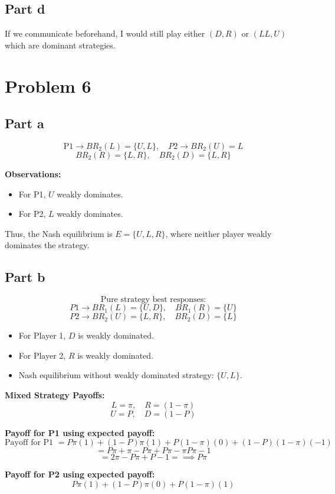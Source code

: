 \documentclass{article}
\begin{document}
\subsection{Part d} 
If we communicate beforehand, I would still play either $(D,R)$ or $(LL, U)$ which are dominant strategies. 

\section{Problem 6}

\subsection{Part a}
\[
\text{P1} \to BR_2(L) = \{U, L\}, \quad P2 \to BR_2(U) = L
\]
\[
BR_2(R) = \{L, R\}, \quad BR_2(D) = \{L, R\}
\]

\textbf{Observations:}
\begin{itemize}
    \item For P1, $U$ weakly dominates.
    \item For P2, $L$ weakly dominates.
\end{itemize}

Thus, the Nash equilibrium is $E = \{U, L, R\}$, where neither player weakly dominates the strategy.

\subsection{Part b}
\[
\text{Pure strategy best responses:}
\]
\[
P1 \to BR_1(L) = \{U, D\}, \quad BR_1(R) = \{U\}
\]
\[
P2 \to BR_2(U) = \{L, R\}, \quad BR_2(D) = \{L\}
\]

\begin{itemize}
    \item For Player 1, $D$ is weakly dominated.
    \item For Player 2, $R$ is weakly dominated.
    \item Nash equilibrium without weakly dominated strategy: $\{U, L\}$.
\end{itemize}

\textbf{Mixed Strategy Payoffs:}
\[
L = \pi, \quad R = (1 - \pi)
\]
\[
U = P, \quad D = (1 - P)
\]

\textbf{Payoff for P1 using expected payoff:}
\[
\text{Payoff for P1 } = P\pi(1) + (1 - P)\pi(1) + P(1 - \pi)(0) + (1 - P)(1 - \pi)(-1)
\]
\[
= P\pi + \pi - P\pi + P\pi - \pi P\pi - 1
\]
\[
= 2\pi - P\pi + P - 1 =\implies P\pi
\]

\textbf{Payoff for P2 using expected payoff:}
\[
P\pi(1) + (1 - P)\pi(0) + P(1 - \pi)(1)
\]
\end{document}

